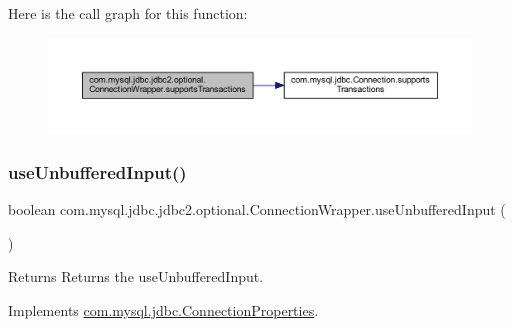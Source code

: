 Here is the call graph for this function\+:
\nopagebreak
\begin{figure}[H]
\begin{center}
\leavevmode
\includegraphics[width=350pt]{classcom_1_1mysql_1_1jdbc_1_1jdbc2_1_1optional_1_1_connection_wrapper_a1f15bbe2ddf9ab93df95fd71932a0908_cgraph}
\end{center}
\end{figure}
\mbox{\label{classcom_1_1mysql_1_1jdbc_1_1jdbc2_1_1optional_1_1_connection_wrapper_ae90cf2a8ef9234c774cf9567b48f755f}} 
\subsubsection{\texorpdfstring{use\+Unbuffered\+Input()}{useUnbufferedInput()}}
{\footnotesize\ttfamily boolean com.\+mysql.\+jdbc.\+jdbc2.\+optional.\+Connection\+Wrapper.\+use\+Unbuffered\+Input (\begin{DoxyParamCaption}{ }\end{DoxyParamCaption})}

\begin{DoxyReturn}{Returns}
Returns the use\+Unbuffered\+Input. 
\end{DoxyReturn}


Implements \mbox{\hyperlink{interfacecom_1_1mysql_1_1jdbc_1_1_connection_properties_ae9cefafa60524eaec697493db7349cc1}{com.\+mysql.\+jdbc.\+Connection\+Properties}}.

